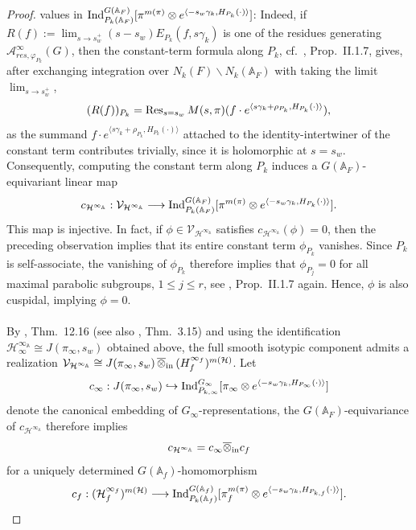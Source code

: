 \documentclass[a4paper,10pt]{amsart}
\theoremstyle{definition}
\numberwithin{equation}{section}
\def\A{\mathbb A}
\def\<{\langle}
\def\>{\rangle}
\begin{document}
\begin{proof}
values in ${\rm Ind}_{P_k(\A_F)}^{G(\A_F)}[\pi^{m(\pi)}\otimes e^{\langle -s_w\gamma_k,H_{P_k}(\cdot)\rangle}]$: Indeed, if
$R(f):=\lim_{s\rightarrow s_w^+}(s-s_w)E_{P_k}(f,s\gamma_k)$ is one of the residues generating $\mathcal A^\infty_{res,\varphi_{P_k}}(G)$, then the constant-term
formula along $P_k$, cf.\ \cite{moewal}, Prop.\ II.1.7, gives, after exchanging integration over $N_k(F)\backslash N_k(\A_F)$ with taking the limit $\lim_{s\rightarrow s_w^+}$, 
\begin{equation}\label{eq:constant-term-residue}
 (R(f))_{P_k}
 =
 {\rm Res}_{s=s_w}\,M(s,\pi)(f\cdot e^{\<s\gamma_k+\rho_{P_k},H_{P_k}(\cdot)\>}),
\end{equation}
as the summand $f\cdot e^{\<s\gamma_k+\rho_{P_k},H_{P_k}(\cdot)\>}$ attached to the identity-intertwiner of the constant term contributes trivially, since it
is holomorphic at $s=s_w$. Consequently, computing the constant term along $P_k$ induces a $G(\A_F)$-equivariant linear map
$$
 c_{\mathcal H^{\infty_\A}}:\mathcal V_{\mathcal H^{\infty_\A}}
 \longrightarrow
 {\rm Ind}_{P_k(\A_F)}^{G(\A_F)}[\pi^{m(\pi)}\otimes e^{\langle -s_w\gamma_k,H_{P_k}(\cdot)\rangle}].
$$
This map is injective. In fact, if
$\phi\in\mathcal V_{\mathcal H^{\infty_\A}}$ satisfies $c_{\mathcal H^{\infty_\A}}(\phi)=0$, then the preceding observation implies that its entire constant term $\phi_{P_k}$ vanishes. Since $P_k$ is self-associate, the vanishing of $\phi_{P_k}$ therefore implies that $\phi_{P_j}=0$ for all maximal parabolic subgroups, $1\leq j\leq r$, see \cite{moewal}, Prop.\ II.1.7 again. Hence, $\phi$ is also cuspidal, implying $\phi=0$.\\\\ 
By \cite{grob_book}, Thm.\ 12.16 (see also \cite{grob_zun}, Thm.\ 3.15) and using the identification $\mathcal H^{\infty_\A}_\infty\cong J(\pi_\infty,s_w)$ obtained above, the full smooth isotypic component admits a realization $\mathcal V_{\mathcal H^{\infty_\A}}\cong J(\pi_\infty,s_w)\,\overline\otimes_{\rm in}\,\mathcal (H^{\infty_f}_f)^{m(\mathcal H)}$.
Let
$$c_\infty:J(\pi_\infty,s_w)\hookrightarrow {\rm Ind}_{P_{k,\infty}}^{G_\infty}[\pi_\infty\otimes e^{\langle -s_w \gamma_k, H_{P_\infty}(\cdot)\rangle}]$$ 
denote the canonical embedding of $G_\infty$-representations, the $G(\A_F)$-equivariance of
$c_{\mathcal H^{\infty_\A}}$ therefore implies $$
 c_{\mathcal H^{\infty_\A}}
 =c_\infty\overline\otimes_{\rm in}c_f
$$
for a uniquely determined $G(\A_f)$-homomorphism
$$
 c_f:
 (\mathcal H^{\infty_f}_f)^{m(\mathcal H)} \longrightarrow
  {\rm Ind}_{P_k(\A_f)}^{G(\A_f)}[\pi_f^{m(\pi)}\otimes e^{\langle -s_w\gamma_k,H_{P_{k,f}}(\cdot)\rangle}].
$$
\end{proof}
\end{document}
